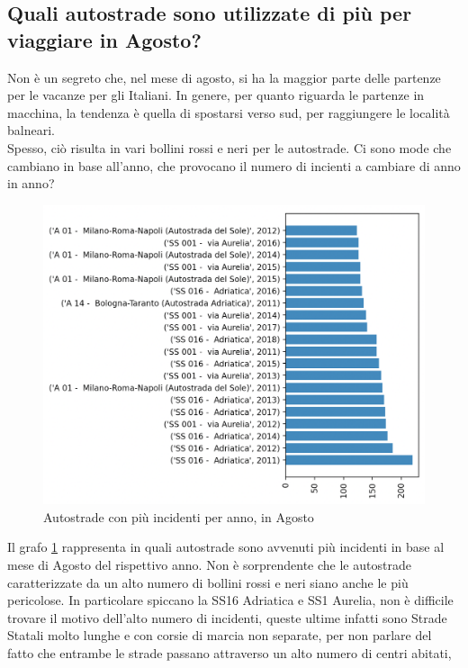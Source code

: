 \documentclass[a4paper]{report}
\begin{document}
\subsection{Quali autostrade sono utilizzate di più per viaggiare in Agosto?}

Non è un segreto che, nel mese di agosto, si ha la maggior parte delle partenze per le vacanze per 
gli Italiani. In genere, per quanto riguarda le partenze in macchina, la tendenza è quella di spostarsi verso sud, 
per raggiungere le località balneari.\\
Spesso, ciò risulta in vari bollini rossi e neri per le autostrade. 
Ci sono mode che cambiano in base all'anno, 
che provocano il numero di incienti a cambiare di anno in anno? 

\begin{figure}
    \includegraphics[width=\linewidth]{../src/incidenti/incidenti_aci/agosto/autostrade_anno_agosto.png}
    \caption{Autostrade con più incidenti per anno, in Agosto}
    \label{fig:autostrade-anno-agosto}
\end{figure}

Il grafo \ref{fig:autostrade-anno-agosto} rappresenta in quali autostrade sono avvenuti 
più incidenti in base al mese di Agosto del rispettivo anno.
Non è sorprendente che le autostrade caratterizzate da un alto numero di bollini rossi e neri 
siano anche le più pericolose.
In particolare spiccano la SS16 Adriatica e SS1 Aurelia, non è difficile trovare il motivo 
dell'alto numero di incidenti, 
queste ultime infatti sono Strade Statali molto lunghe e con corsie di marcia non separate, 
per non parlare del fatto che entrambe le strade passano attraverso un alto numero di centri abitati, 
\end{document}
